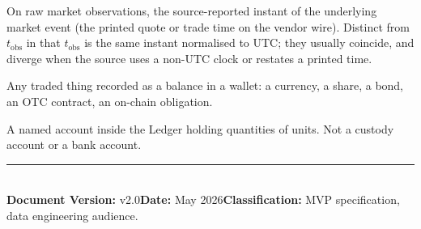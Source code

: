 \documentclass[11pt,a4paper]{article}
\begin{document}
\begin{description}[style=nextline,leftmargin=1em,labelindent=0pt]
\item[\texttt{value\_time}] On raw market observations, the source-reported instant of the underlying market event (the printed quote or trade time on the vendor wire). Distinct from $t_\text{obs}$ in that $t_\text{obs}$ is the same instant normalised to UTC; they usually coincide, and diverge when the source uses a non-UTC clock or restates a printed time.
\item[Unit] Any traded thing recorded as a balance in a wallet: a currency, a share, a bond, an OTC contract, an on-chain obligation.
\item[Wallet] A named account inside the Ledger holding quantities of units. Not a custody account or a bank account.
\end{description}

\vspace{0.5em}
\noindent\rule{\textwidth}{0.4pt}\\
\noindent\textbf{Document Version:} v2.0\quad\textbf{Date:} May 2026\quad\textbf{Classification:} MVP specification, data engineering audience.
\end{document}

